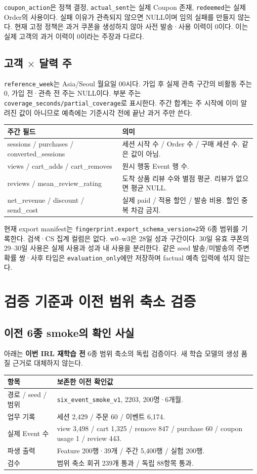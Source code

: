 \documentclass[11pt,a4paper]{article}
\newcommand{\code}[1]{{\ttfamily\footnotesize\nolinkurl{#1}}}
\newcommand{\page}{\clearpage}
\newcommand{\thead}{\rowcolor{pale}}
\begin{document}
\code{coupon_action}은 정책 결정, \code{actual_sent}는 실제 Coupon 존재, \code{redeemed}는 실제 Order의 사용이다. 실패 이유가 관측되지 않으면 NULL이며 임의 실패를 만들지 않는다. 현재 고정 정책은 과거 쿠폰을 생성하지 않아 사전 발송·사용 이력이 0이다. 이는 실제 고객의 과거 이력이 0이라는 주장과 다르다.

\subsection{고객 $\times$ 달력 주}
\code{reference_week}는 Asia/Seoul 월요일 00시다. 가입 후 실제 관측 구간의 비활동 주는 0, 가입 전·관측 전 주는 NULL이다. 부분 주는 \code{coverage_seconds/partial_coverage}로 표시한다. 주간 합계는 주 시작에 이미 알려진 값이 아니므로 예측에는 기준시각 전에 끝난 과거 주만 쓴다.

\begin{tabularx}{\linewidth}{@{}P{.35\linewidth}Y@{}}\thead 주간 필드 & 의미\\\midrule
sessions / purchases / converted\_sessions & 세션 시작 수 / Order 수 / 구매 세션 수. 같은 값이 아님.\\
views / cart\_adds / cart\_removes & 원시 행동 Event 행 수.\\
reviews / mean\_review\_rating & 도착 상품 리뷰 수와 별점 평균. 리뷰가 없으면 평균 NULL.\\
net\_revenue / discount / send\_cost & 실제 paid / 적용 할인 / 발송 비용. 할인 중복 차감 금지.\\\bottomrule\end{tabularx}

현재 export manifest는 \code{fingerprint.export_schema_version=2}와 6종 범위를 기록한다. 검색·CS 집계 컬럼은 없다. w0--w3은 28일 성과 구간이다. 30일 유효 쿠폰의 29--30일 사용은 실제 사용과 성과 내 사용을 분리한다. 같은 seed 발송/미발송의 주변확률 쌍·사후 타입은 \code{evaluation_only}에만 저장하며 factual 예측 입력에 섞지 않는다.

\page
\section{검증 기준과 이전 범위 축소 검증}
\subsection{이전 6종 smoke의 확인 사실}
아래는 \textbf{이번 IRL 재학습 전} 6종 범위 축소의 독립 검증이다. 새 학습 모델의 생성 품질 근거로 대체하지 않는다.

\begin{tabularx}{\linewidth}{@{}P{.46\linewidth}Y@{}}\thead 항목 & 보존한 이전 확인값\\\midrule
경로 / seed / 범위 & \code{six_event_smoke_v1}, 2203, 200명·6개월.\\
업무 기록 & 세션 2,429 / 주문 60 / 이벤트 6,174.\\
실제 Event 수 & view 3,498 / cart 1,325 / remove 847 / purchase 60 / coupon usage 1 / review 443.\\
파생 출력 & Feature 200행·39개 / 주간 5,400행 / 실험 200행.\\
검수 & 범위 축소 회귀 239개 통과 / 독립 88항목 통과.\\\bottomrule\end{tabularx}
\end{document}
